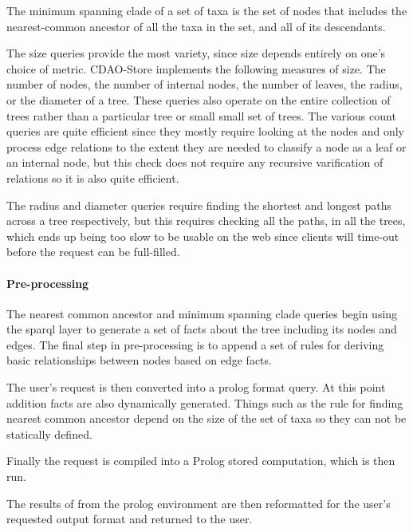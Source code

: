 \documentclass[10pt]{article}
\begin{document}
       The minimum spanning clade of a set of taxa is the set of nodes that
includes the nearest-common ancestor of all the taxa in the set, and all of its
descendants.

       The size queries provide the most variety, since size depends entirely
on one's choice of metric. CDAO-Store implements the following measures of
size. The number of nodes, the number of internal nodes, the number of leaves,
the radius, or the diameter of a tree. These queries also operate on the entire
collection of trees rather than a particular tree or small small set of trees.
The various count queries are quite efficient since they mostly require looking
at the nodes and only process edge relations to the extent they are needed to
classify a node as a leaf or an internal node, but this check does not require
any recursive varification of relations so it is also quite efficient.

       The radius and diameter queries require finding the shortest and longest
paths across a tree respectively, but this requires checking all the paths, in
all the trees, which ends up being too slow to be usable on the web since
clients will time-out before the request can be full-filled. 

       \paragraph{Pre-processing}
       The nearest common ancestor and minimum spanning clade queries begin
using the sparql layer to generate a set of facts about the tree including its
nodes and edges. The final step in pre-processing is to append a set of rules
for deriving basic relationships between nodes based on edge facts.

       The user's request is then converted into a prolog format query. At this
point addition facts are also dynamically generated. Things such as the rule
for finding nearest common ancestor depend on the size of the set of taxa so
they can not be statically defined. 
       
       Finally the request is compiled into a Prolog stored computation, which
is then run. 

       The results of from the prolog environment are then reformatted for the
user's requested output format and returned to the user.
\end{document}
